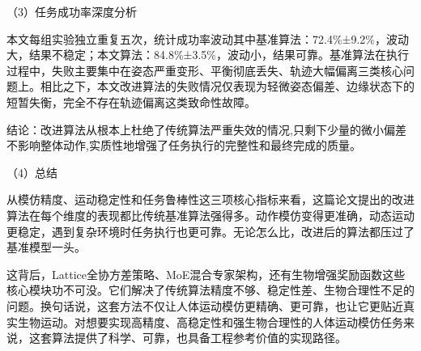 （3）任务成功率深度分析

本文每组实验独立重复五次，统计成功率波动其中基准算法：72.4\%±9.2\%，波动大，结果不稳定；本文算法：84.8\%±3.5\%，波动小，结果可靠。基准算法在执行过程中，失败主要集中在姿态严重变形、平衡彻底丢失、轨迹大幅偏离三类核心问题上。相比之下，本文改进算法的失败情况仅表现为轻微姿态偏差、边缘状态下的短暂失衡，完全不存在轨迹偏离这类致命性故障。

结论：改进算法从根本上杜绝了传统算法严重失效的情况,只剩下少量的微小偏差不影响整体动作,实质性地增强了任务执行的完整性和最终完成的质量。

（4）总结

从模仿精度、运动稳定性和任务鲁棒性这三项核心指标来看，这篇论文提出的改进算法在每个维度的表现都比传统基准算法强得多。动作模仿变得更准确，动态运动更稳定，遇到复杂环境时任务执行也更可靠。无论怎么比，改进后的算法都压过了基准模型一头。

这背后，Lattice全协方差策略、MoE混合专家架构，还有生物增强奖励函数这些核心模块功不可没。它们解决了传统算法精度不够、稳定性差、生物合理性不足的问题。换句话说，这套方法不仅让人体运动模仿更精确、更可靠，也让它更贴近真实生物运动。对想要实现高精度、高稳定性和强生物合理性的人体运动模仿任务来说，这套算法提供了科学、可靠，也具备工程参考价值的实现路径。
